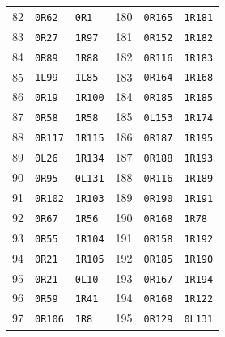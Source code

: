 \begin{longtable}{rll@{\qquad}rll}
82 & \texttt{0R62} & \texttt{0R1} & 180 & \texttt{0R165} & \texttt{1R181}\\
83 & \texttt{0R27} & \texttt{1R97} & 181 & \texttt{0R152} & \texttt{1R182}\\
84 & \texttt{0R89} & \texttt{1R88} & 182 & \texttt{0R116} & \texttt{1R183}\\
85 & \texttt{1L99} & \texttt{1L85} & 183 & \texttt{0R164} & \texttt{1R168}\\
86 & \texttt{0R19} & \texttt{1R100} & 184 & \texttt{0R185} & \texttt{1R185}\\
87 & \texttt{0R58} & \texttt{1R58} & 185 & \texttt{0L153} & \texttt{1R174}\\
88 & \texttt{0R117} & \texttt{1R115} & 186 & \texttt{0R187} & \texttt{1R195}\\
89 & \texttt{0L26} & \texttt{1R134} & 187 & \texttt{0R188} & \texttt{1R193}\\
90 & \texttt{0R95} & \texttt{0L131} & 188 & \texttt{0R116} & \texttt{1R189}\\
91 & \texttt{0R102} & \texttt{1R103} & 189 & \texttt{0R190} & \texttt{1R191}\\
92 & \texttt{0R67} & \texttt{1R56} & 190 & \texttt{0R168} & \texttt{1R78}\\
93 & \texttt{0R55} & \texttt{1R104} & 191 & \texttt{0R158} & \texttt{1R192}\\
94 & \texttt{0R21} & \texttt{1R105} & 192 & \texttt{0R185} & \texttt{1R190}\\
95 & \texttt{0R21} & \texttt{0L10} & 193 & \texttt{0R167} & \texttt{1R194}\\
96 & \texttt{0R59} & \texttt{1R41} & 194 & \texttt{0R168} & \texttt{1R122}\\
97 & \texttt{0R106} & \texttt{1R8} & 195 & \texttt{0R129} & \texttt{0L131}\\
\end{longtable}
\normalsize
